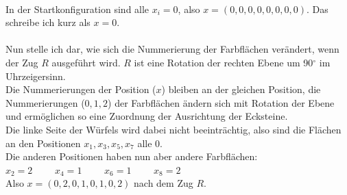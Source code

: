 \documentclass[12pt,a4paper, usenames, dvipsnames]{article}
\begin{document}
\ \\
In der Startkonfiguration sind alle $x_i = 0$, also $x=(0, 0, 0, 0, 0, 0, 0, 0)$. Das schreibe ich kurz als $x=0$.\\
\ \\
Nun stelle ich dar, wie sich die Nummerierung der Farbflächen verändert, wenn der Zug $R$ ausgeführt wird. $R$ ist eine Rotation der rechten Ebene um 90$^\circ$ im Uhrzeigersinn. \\
Die Nummerierungen der Position ($x$) bleiben an der gleichen Position, die Nummerierungen ($0, 1, 2$) der Farbflächen ändern sich mit Rotation der Ebene und ermöglichen so eine Zuordnung der Ausrichtung der Ecksteine. \\
Die linke Seite der Würfels wird dabei nicht beeinträchtig, also sind die Flächen an den Positionen $x_1, x_3, x_5, x_7$ alle 0. \\
Die anderen Positionen haben nun aber andere Farbflächen: \\
$x_2 = 2$ \ \ \ \ $x_4 = 1$ \ \ \ \ $x_6 = 1$ \ \ \ \ $x_8 = 2$  \\
Also $x = (0, 2, 0, 1, 0, 1, 0, 2)$ nach dem Zug $R$. \\
\end{document}
